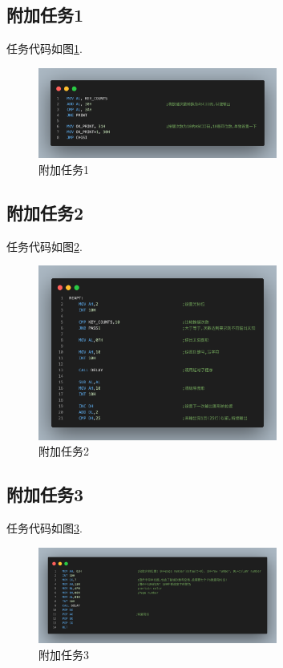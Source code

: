 \documentclass[11pt]{SEU-Digital-Report}
\begin{document}
\subsection{附加任务1}
任务代码如图\ref{fig:task1}.
\begin{figure}[htbp]
    \centering
    \includegraphics[width=0.7\textwidth]{fig/task1.png}
    \caption{附加任务1}
    \label{fig:task1}
\end{figure}

\subsection{附加任务2}
任务代码如图\ref{fig:task2}.
\begin{figure}[htbp]
    \centering
    \includegraphics[width=0.7\textwidth]{fig/task2.png}
    \caption{附加任务2}
    \label{fig:task2}
\end{figure}

\subsection{附加任务3}
任务代码如图\ref{fig:task3}.
\begin{figure}[htbp]
    \centering
    \includegraphics[width=0.7\textwidth]{fig/task3.png}
    \caption{附加任务3}
    \label{fig:task3}
\end{figure}
\end{document}

